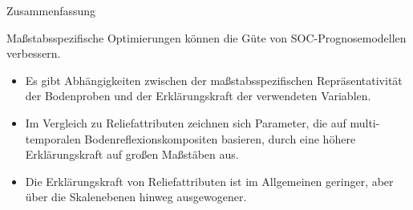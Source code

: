 








\begin{frame}{Zusammenfassung}
\begin{alertblock}{Maßstabsspezifische Optimierungen können die Güte von SOC-Prognosemodellen verbessern.}
\begin{itemize}
\item Es gibt Abhängigkeiten zwischen der maßstabsspezifischen Repräsentativität der Bodenproben und der Erklärungskraft der verwendeten Variablen. 
\item Im Vergleich zu Reliefattributen zeichnen sich Parameter, die auf multi-temporalen Bodenreflexionskompositen basieren, durch eine höhere Erklärungskraft auf großen Maßstäben aus. 
\item Die Erklärungskraft von Reliefattributen ist im Allgemeinen geringer, aber über die Skalenebenen hinweg ausgewogener.
\end{itemize}
\end{alertblock}   


\end{frame}

